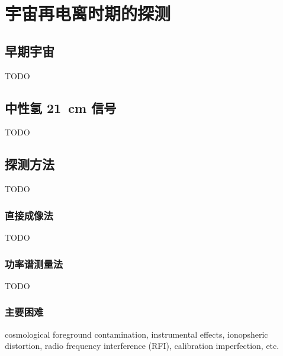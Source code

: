 
\chapter{宇宙再电离时期的探测}
\label{chap:detection}


\section{早期宇宙}
\label{sec:early-universe}

TODO


\section{中性氢 \SI{21}{\cm} 信号}
\label{sec:21cm-signal}

TODO


\section{探测方法}

TODO

\subsection{直接成像法}

TODO

\subsection{功率谱测量法}

TODO

\subsection{主要困难}

cosmological foreground contamination,
instrumental effects, ionopsheric distortion,
radio frequency interference (RFI),
calibration imperfection, etc.


